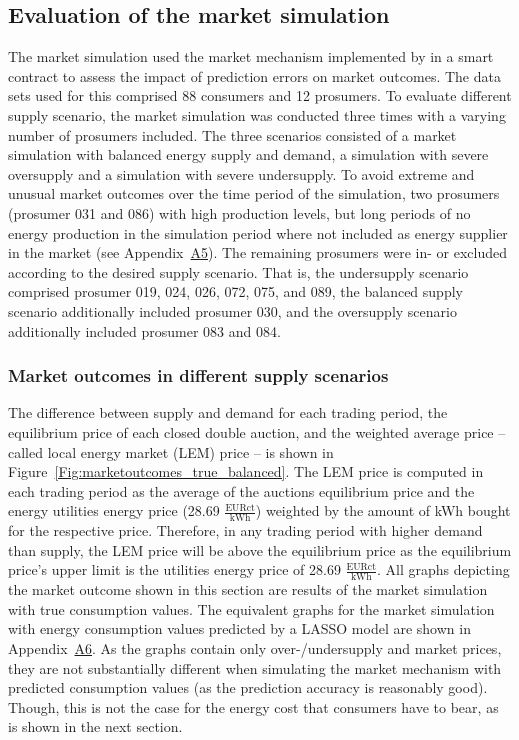 \subsection{Evaluation of the market simulation}\label{Sec:Results;Subsec:Simulation}

The market simulation used the market mechanism implemented by \citet{Mengelkamp:2018a} in a smart contract to assess the impact of prediction errors on market outcomes. The data sets used for this comprised 88 consumers and 12 prosumers. To evaluate different supply scenario, the market simulation was conducted three times with a varying number of prosumers included. The three scenarios consisted of a market simulation with balanced energy supply and demand, a simulation with severe oversupply and a simulation with severe undersupply. To avoid extreme and unusual market outcomes over the time period of the simulation, two prosumers (prosumer 031 and 086) with high production levels, but long periods of no energy production in the simulation period where not included as energy supplier in the market (see Appendix~\hyperlink{AppA5:Figures:producer_all}{A5}). The remaining prosumers were in- or excluded according to the desired supply scenario. That is, the undersupply scenario comprised prosumer 019, 024, 026, 072, 075, and 089, the balanced supply scenario additionally included prosumer 030, and the oversupply scenario additionally included prosumer 083 and 084.

\subsubsection{Market outcomes in different supply scenarios}

The difference between supply and demand for each trading period, the equilibrium price of each closed double auction, and the weighted average price -- called local energy market (LEM) price -- is shown in Figure~\ref{Fig:marketoutcomes_true_balanced}. The LEM price is computed in each trading period as the average of the auctions equilibrium price and the energy utilities energy price (28.69 $\frac{\text{EURct}}{\text{kWh}}$) weighted by the amount of kWh bought for the respective price. Therefore, in any trading period with higher demand than supply, the LEM price will be above the equilibrium price as the equilibrium price's upper limit is the utilities energy price of 28.69 $\frac{\text{EURct}}{\text{kWh}}$. All graphs depicting the market outcome shown in this section are results of the market simulation with true consumption values. The equivalent graphs for the market simulation with energy consumption values predicted by a LASSO model are shown in Appendix~\hyperlink{AppA6:Figures:marketsimulation_pred}{A6}. As the graphs contain only over-/undersupply and market prices, they are not substantially different when simulating the market mechanism with predicted consumption values (as the prediction accuracy is reasonably good). Though, this is not the case for the energy cost that consumers have to bear, as is shown in the next section.

